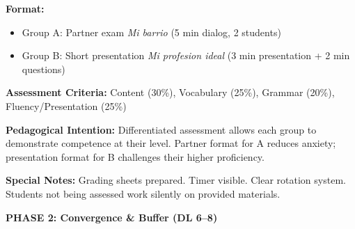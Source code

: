 \documentclass[11pt, a4paper]{article}
\newcommand{\es}[1]{\textcolor{spanisch}{\textit{#1}}}
\begin{document}
{{\textbf{Format:}
\begin{itemize}[nosep, leftmargin=1.5em]
    \item \textcolor{gruppeA}{Group A:} Partner exam \es{Mi barrio} (5 min dialog, 2 students)
    \item \textcolor{gruppeB}{Group B:} Short presentation \es{Mi profesion ideal} (3 min presentation + 2 min questions)
\end{itemize}

\textbf{Assessment Criteria:} Content (30\%), Vocabulary (25\%), Grammar (20\%), Fluency/Presentation (25\%)

\textbf{Pedagogical Intention:} Differentiated assessment allows each group to demonstrate competence at their level. Partner format for A reduces anxiety; presentation format for B challenges their higher proficiency.

\textbf{Special Notes:} Grading sheets prepared. Timer visible. Clear rotation system. Students not being assessed work silently on provided materials.
}}

\vspace{0.4cm}

\textbf{\color{spanisch} PHASE 2: Convergence \& Buffer (DL 6--8)}

\vspace{0.2cm}
\end{document}
